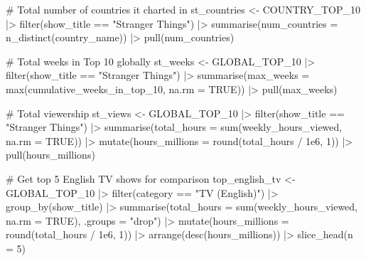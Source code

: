 \documentclass[
  12pt,
  letterpaper,
  DIV=11,
  numbers=noendperiod]{scrartcl}
\newenvironment{Shaded}{\begin{snugshade}}{\end{snugshade}}
\newcommand{\AttributeTok}[1]{\textcolor[rgb]{0.40,0.45,0.13}{#1}}
\newcommand{\CommentTok}[1]{\textcolor[rgb]{0.37,0.37,0.37}{#1}}
\newcommand{\ConstantTok}[1]{\textcolor[rgb]{0.56,0.35,0.01}{#1}}
\newcommand{\DecValTok}[1]{\textcolor[rgb]{0.68,0.00,0.00}{#1}}
\newcommand{\FloatTok}[1]{\textcolor[rgb]{0.68,0.00,0.00}{#1}}
\newcommand{\FunctionTok}[1]{\textcolor[rgb]{0.28,0.35,0.67}{#1}}
\newcommand{\NormalTok}[1]{\textcolor[rgb]{0.00,0.23,0.31}{#1}}
\newcommand{\OtherTok}[1]{\textcolor[rgb]{0.00,0.23,0.31}{#1}}
\newcommand{\SpecialCharTok}[1]{\textcolor[rgb]{0.37,0.37,0.37}{#1}}
\newcommand{\StringTok}[1]{\textcolor[rgb]{0.13,0.47,0.30}{#1}}
\begin{document}
\begin{Shaded}
\begin{Highlighting}[]
\CommentTok{\# Total number of countries it charted in}
\NormalTok{st\_countries }\OtherTok{\textless{}{-}}\NormalTok{ COUNTRY\_TOP\_10 }\SpecialCharTok{|\textgreater{}}
  \FunctionTok{filter}\NormalTok{(show\_title }\SpecialCharTok{==} \StringTok{"Stranger Things"}\NormalTok{) }\SpecialCharTok{|\textgreater{}}
  \FunctionTok{summarise}\NormalTok{(}\AttributeTok{num\_countries =} \FunctionTok{n\_distinct}\NormalTok{(country\_name)) }\SpecialCharTok{|\textgreater{}}
  \FunctionTok{pull}\NormalTok{(num\_countries)}

\CommentTok{\# Total weeks in Top 10 globally}
\NormalTok{st\_weeks }\OtherTok{\textless{}{-}}\NormalTok{ GLOBAL\_TOP\_10 }\SpecialCharTok{|\textgreater{}}
  \FunctionTok{filter}\NormalTok{(show\_title }\SpecialCharTok{==} \StringTok{"Stranger Things"}\NormalTok{) }\SpecialCharTok{|\textgreater{}}
  \FunctionTok{summarise}\NormalTok{(}\AttributeTok{max\_weeks =} \FunctionTok{max}\NormalTok{(cumulative\_weeks\_in\_top\_10, }\AttributeTok{na.rm =} \ConstantTok{TRUE}\NormalTok{)) }\SpecialCharTok{|\textgreater{}}
  \FunctionTok{pull}\NormalTok{(max\_weeks)}

\CommentTok{\# Total viewership}
\NormalTok{st\_views }\OtherTok{\textless{}{-}}\NormalTok{ GLOBAL\_TOP\_10 }\SpecialCharTok{|\textgreater{}}
  \FunctionTok{filter}\NormalTok{(show\_title }\SpecialCharTok{==} \StringTok{"Stranger Things"}\NormalTok{) }\SpecialCharTok{|\textgreater{}}
  \FunctionTok{summarise}\NormalTok{(}\AttributeTok{total\_hours =} \FunctionTok{sum}\NormalTok{(weekly\_hours\_viewed, }\AttributeTok{na.rm =} \ConstantTok{TRUE}\NormalTok{)) }\SpecialCharTok{|\textgreater{}}
  \FunctionTok{mutate}\NormalTok{(}\AttributeTok{hours\_millions =} \FunctionTok{round}\NormalTok{(total\_hours }\SpecialCharTok{/} \FloatTok{1e6}\NormalTok{, }\DecValTok{1}\NormalTok{)) }\SpecialCharTok{|\textgreater{}}
  \FunctionTok{pull}\NormalTok{(hours\_millions)}

\CommentTok{\# Get top 5 English TV shows for comparison}
\NormalTok{top\_english\_tv }\OtherTok{\textless{}{-}}\NormalTok{ GLOBAL\_TOP\_10 }\SpecialCharTok{|\textgreater{}}
  \FunctionTok{filter}\NormalTok{(category }\SpecialCharTok{==} \StringTok{"TV (English)"}\NormalTok{) }\SpecialCharTok{|\textgreater{}}
  \FunctionTok{group\_by}\NormalTok{(show\_title) }\SpecialCharTok{|\textgreater{}}
  \FunctionTok{summarise}\NormalTok{(}\AttributeTok{total\_hours =} \FunctionTok{sum}\NormalTok{(weekly\_hours\_viewed, }\AttributeTok{na.rm =} \ConstantTok{TRUE}\NormalTok{), }\AttributeTok{.groups =} \StringTok{"drop"}\NormalTok{) }\SpecialCharTok{|\textgreater{}}
  \FunctionTok{mutate}\NormalTok{(}\AttributeTok{hours\_millions =} \FunctionTok{round}\NormalTok{(total\_hours }\SpecialCharTok{/} \FloatTok{1e6}\NormalTok{, }\DecValTok{1}\NormalTok{)) }\SpecialCharTok{|\textgreater{}}
  \FunctionTok{arrange}\NormalTok{(}\FunctionTok{desc}\NormalTok{(hours\_millions)) }\SpecialCharTok{|\textgreater{}}
  \FunctionTok{slice\_head}\NormalTok{(}\AttributeTok{n =} \DecValTok{5}\NormalTok{)}


\end{Highlighting}
\end{Shaded}
\end{document}
